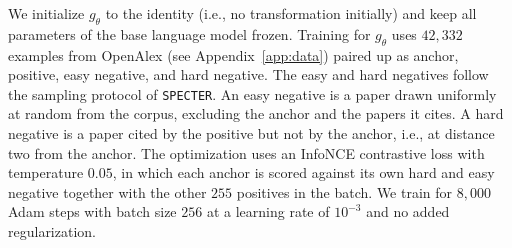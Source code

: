 We initialize $g_\theta$ to the identity (i.e., no transformation initially) and keep all parameters of the base language model frozen. Training for $g_\theta$ uses $42{,}332$ examples from OpenAlex (see Appendix~\ref{app:data}) paired up as anchor, positive, easy negative, and hard negative.
The easy and hard negatives follow the sampling protocol of \texttt{SPECTER}. An easy negative is a paper drawn uniformly at random from the corpus, excluding the anchor and the papers it cites. A hard negative is a paper cited by the positive but not by the anchor, i.e., at distance two from the anchor. The optimization uses an InfoNCE contrastive loss with temperature $0.05$, in which each anchor is scored against its own hard and easy negative together with the other $255$ positives in the batch. We train for $8{,}000$ Adam steps with batch size $256$ at a learning rate of $10^{-3}$ and no added regularization.
